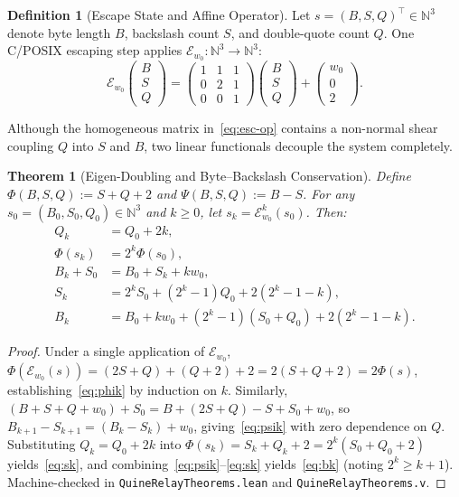 \documentclass[10pt,twocolumn]{article}
\newtheorem{theorem}{Theorem}
\theoremstyle{definition}
\newtheorem{definition}{Definition}
\begin{document}
\begin{definition}[Escape State and Affine Operator]
Let $s = (B, S, Q)^\top \in \mathbb{N}^3$ denote byte length $B$, backslash count $S$, and double-quote count $Q$. One C/POSIX escaping step applies $\mathcal{E}_{w_0} : \mathbb{N}^3 \to \mathbb{N}^3$:
\begin{equation}
\mathcal{E}_{w_0}\!\begin{pmatrix} B \\ S \\ Q \end{pmatrix}
= \begin{pmatrix} 1 & 1 & 1 \\ 0 & 2 & 1 \\ 0 & 0 & 1 \end{pmatrix}
\begin{pmatrix} B \\ S \\ Q \end{pmatrix}
+ \begin{pmatrix} w_0 \\ 0 \\ 2 \end{pmatrix}.
\label{eq:esc-op}
\end{equation}
\end{definition}

Although the homogeneous matrix in~\eqref{eq:esc-op} contains a non-normal shear coupling $Q$ into $S$ and $B$, two linear functionals decouple the system completely.

\begin{theorem}[Eigen-Doubling and Byte--Backslash Conservation]
\label{thm:eigen}
Define $\Phi(B,S,Q) := S + Q + 2$ and $\Psi(B,S,Q) := B - S$. For any $s_0 = (B_0, S_0, Q_0) \in \mathbb{N}^3$ and $k \ge 0$, let $s_k = \mathcal{E}_{w_0}^k(s_0)$. Then:
\begin{align}
Q_k &= Q_0 + 2k, \label{eq:qk} \\
\Phi(s_k) &= 2^k \Phi(s_0), \label{eq:phik} \\
B_k + S_0 &= B_0 + S_k + k w_0, \label{eq:psik} \\
S_k &= 2^k S_0 + (2^k - 1) Q_0 + 2(2^k - 1 - k), \label{eq:sk} \\
B_k &= B_0 + k w_0 + (2^k - 1)(S_0 + Q_0) + 2(2^k - 1 - k). \label{eq:bk}
\end{align}
\end{theorem}
\begin{proof}
Under a single application of $\mathcal{E}_{w_0}$, $\Phi(\mathcal{E}_{w_0}(s)) = (2S + Q) + (Q + 2) + 2 = 2(S + Q + 2) = 2\Phi(s)$, establishing~\eqref{eq:phik} by induction on $k$. Similarly, $(B + S + Q + w_0) + S_0 = B + (2S + Q) - S + S_0 + w_0$, so $B_{k+1} - S_{k+1} = (B_k - S_k) + w_0$, giving~\eqref{eq:psik} with zero dependence on $Q$. Substituting $Q_k = Q_0 + 2k$ into $\Phi(s_k) = S_k + Q_k + 2 = 2^k(S_0 + Q_0 + 2)$ yields~\eqref{eq:sk}, and combining~\eqref{eq:psik}--\eqref{eq:sk} yields~\eqref{eq:bk} (noting $2^k \ge k + 1$). Machine-checked in \texttt{QuineRelayTheorems.lean} and \texttt{QuineRelayTheorems.v}.
\end{proof}
\end{document}
